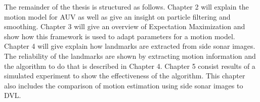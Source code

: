 \documentclass[12pt]{dalcsthesis}
\begin{document}
The remainder of the thesis is structured as follows. Chapter 2 will explain the motion model for AUV as well as give an insight on particle filtering and smoothing. Chapter 3 will give an overview of Expectation Maximization and show how this framework is used to adapt parameters for a motion model. Chapter 4 will give explain how landmarks are extracted from side sonar images. The reliability of the landmarks are shown by extracting motion information and the algorithm to do that is described in Chapter 4. Chapter 5 consist results of a simulated experiment to show the effectiveness of the algorithm. This chapter also includes the comparison of motion estimation using side sonar images to DVL.
 

\end{document}
